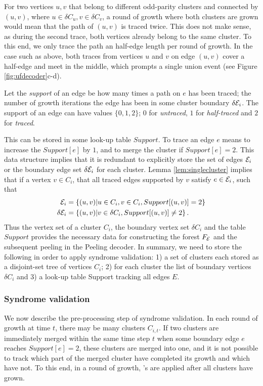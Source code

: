 For two vertices $u,v$ that belong to different odd-parity clusters and connected by $(u,v)$, where $u \in \delta C_u, v \in \delta C_v$, a round of growth where both clusters are grown would mean that the path of $(u,v)$ is traced twice. This does not make sense, as during the second trace, both vertices already belong to the same cluster. To this end, we only trace the path an half-edge length per round of growth. In the case such as above, both traces from vertices $u$ and $v$ on edge $(u,v)$ cover a half-edge and meet in the middle, which prompts a single union event (see Figure \ref{fig:ufdecoder}c-d). 
\begin{definition}\label{def:support}
  Let the \emph{support} of an edge be how many times a path on $e$ has been traced; the number of growth iterations the edge has been in some cluster boundary $\delta\mathcal{E}_i$. The support of an edge can have values $\{0,1,2\}$; $0$ for \emph{untraced}, $1$ for \emph{half-traced} and $2$ for \emph{traced}.
\end{definition}
This can be stored in some look-up table $Support$. To trace an edge $e$ means to increase the $Support[e]$ by $1$, and to merge the cluster if $Support[e]=2$. This data structure implies that it is redundant to explicitly store the set of edges $\mathcal{E}_i$ or the boundary edge set $\delta \mathcal{E}_i$ for each cluster. Lemma \ref{lem:singlecluster} implies that if a vertex $v\in C_i$, that all traced edges supported by $v$ satisfy $e \in \mathcal{E}_i$, such that
\begin{align}
  \mathcal{E}_i &= \left\{(u,v)|u\in C_i, v \in C_i, Support[(u,v)]=2\right\}\\
  \delta \mathcal{E}_i &= \left\{(u,v)| v \in \delta C_i, Support[(u,v)] \neq 2\right\}.
\end{align}
Thus the vertex set of a cluster $C_i$, the boundary vertex set $\delta C_i$ and the table $Support$ provides the necessary data for constructing the forest $F_{\mathcal{E}}$ and the subsequent peeling in the Peeling decoder. In summary, we need to store the following in order to apply syndrome validation: 1) a set of clusters each stored as a disjoint-set tree of vertices $C_i$; 2) for each cluster the list of boundary vertices $\delta C_i$ and 3) a look-up table Support tracking all edges $E$. 

\subsubsection{Syndrome validation}
We now describe the pre-processing step of syndrome validation. In each round of growth at time $t$, there may be many clusters $C_{i,t}$. If two clusters are immediately merged within the same time step $t$ when some boundary edge $e$ reaches $Support[e]=2$, these clusters are merged into one, and it is not possible to track which part of the merged cluster have completed its growth and which have not. To this end, in a round of growth, 's are applied after all clusters have grown.

